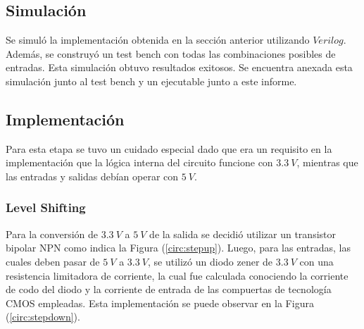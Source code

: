 \subsection{Simulación}

Se simuló la implementación obtenida en la sección anterior utilizando $Verilog$. Además, se construyó un test bench con todas las combinaciones posibles de entradas. Esta simulación obtuvo resultados exitosos. Se encuentra anexada esta simulación junto al test bench y un ejecutable junto a este informe.

\subsection{Implementación}
Para esta etapa se tuvo un cuidado especial dado que era un requisito en la implementación que la lógica interna del circuito funcione con $3.3 \ V$, mientras que las entradas y salidas debían operar con $5 \ V$.

\subsubsection{Level Shifting}
Para la conversión de $3.3 \ V$ a $5 \ V$ de la salida se decidió utilizar un transistor bipolar NPN como indica la Figura (\ref{circ:stepup}). Luego, para las entradas, las cuales deben pasar de $5 \ V$ a $3.3 \ V	$, se utilizó un diodo zener de $3.3 \ V$ con una resistencia limitadora de corriente, la cual fue calculada conociendo la corriente de codo del diodo y la corriente de entrada de las compuertas de tecnología CMOS empleadas. Esta implementación se puede observar en la Figura (\ref{circ:stepdown}). 

